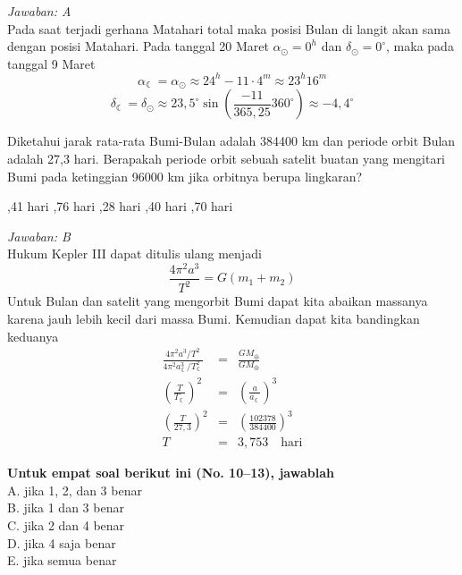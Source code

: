 \documentclass[11pt,fleqn, a4paper]{exam}
\begin{document}
\begin{questions}
\textit{Jawaban: A}\\
Pada saat terjadi gerhana Matahari total maka posisi Bulan di langit akan sama dengan posisi Matahari. Pada tanggal 20 Maret  $\alpha_{\odot} = 0^{h}$ dan $\delta_{\odot} = 0^{\circ}$, maka pada tanggal 9 Maret 
\begin{equation*}
\alpha_{\leftmoon} = \alpha_{\odot} \approx 24^h - 11 \cdot 4^m \approx 23^h 16^m
\end{equation*}
\begin{equation*}
\delta_{\leftmoon} = \delta_{\odot} \approx 23,5^{\circ} \sin{\left( \frac{-11}{365,25} 360^{\circ} \right)}\approx -4,4^{\circ}
\end{equation*}


\vspace{0.5cm}
\question Diketahui jarak rata-rata Bumi-Bulan adalah 384400 km dan periode orbit Bulan adalah 27,3 hari. Berapakah periode orbit sebuah satelit buatan yang mengitari Bumi pada ketinggian 96000 km jika orbitnya berupa lingkaran?
\begin{choices}
,41 hari
,76 hari
,28 hari
,40 hari
,70 hari
\end{choices}

\textit{Jawaban: B}\\
Hukum Kepler III dapat ditulis ulang menjadi
\begin{equation*}
\frac{4 \pi^2 a^3}{T^2} = G(m_{1} + m_{2}) 
\end{equation*}
Untuk Bulan dan satelit yang mengorbit Bumi dapat kita abaikan massanya karena jauh lebih kecil dari massa Bumi. Kemudian dapat kita bandingkan keduanya
\begin{eqnarray*}
\frac{4 \pi^2 a^3/T^2}{4 \pi^2 a_{\leftmoon}^3/T_{\leftmoon}^2} &=& \frac{G M_{\oplus}}{G M_{\oplus}}\\
\left( \frac{T}{T_{\leftmoon}} \right)^2 &=& \left( \frac{a}{a_{\leftmoon}} \right)^3\\
\left( \frac{T}{27,3} \right)^2 &=& \left( \frac{102378}{384400} \right)^3\\
T &=& 3,753 \quad \text{hari}
\end{eqnarray*}





\vspace{1cm}
\textbf{Untuk empat soal berikut ini (No. 10\---13), jawablah}\\
A. jika 1, 2, dan 3 benar\\
B. jika 1 dan 3 benar\\
C. jika 2 dan 4 benar\\
D. jika 4 saja benar\\
E. jika semua benar\\


\end{questions}
\end{document}

